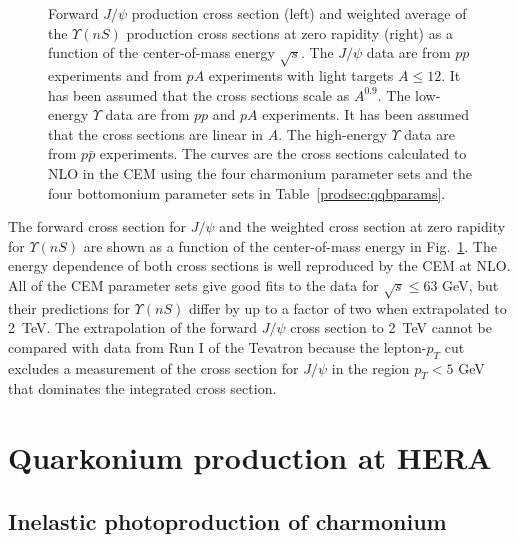\begin{figure}[htb]
\setlength{\epsfxsize=0.95\textwidth}
\setlength{\epsfysize=0.4\textheight}
\begin{center}
\end{center}
\caption{Forward $J/\psi$ production cross section (left) and weighted
average of the $\Upsilon(nS)$ production cross sections at zero rapidity
(right) as a function of the center-of-mass energy $\sqrt{s}$. The
$J/\psi$ data are from $pp$ experiments and from $pA$ experiments with
light targets $A \leq 12$. It has been assumed that the cross sections
scale as $A^{0.9}$.  The low-energy $\Upsilon$ data are from $pp$ and
$pA$ experiments. It has been assumed that the cross sections are linear
in $A$. The high-energy $\Upsilon$ data are from $p \bar p$ experiments.
The curves are the cross sections calculated to NLO in the CEM using the
four charmonium parameter sets and the four bottomonium parameter sets
in Table~\ref{prodsec:qqbparams}.}
\label{psiupsfixt}
\end{figure}

The forward cross section for $J/\psi$ and the weighted cross section at
zero rapidity for $\Upsilon(nS)$ are shown  as a function of the
center-of-mass energy in Fig.~\ref{psiupsfixt}. The energy dependence of
both cross sections is well reproduced by the CEM at NLO. All of the CEM
parameter sets give good fits to the data for $\sqrt{s} \leq 63$ GeV,
but their predictions for $\Upsilon(nS)$ differ by up to a factor of two
when extrapolated to 2~TeV. The extrapolation of the forward $J/\psi$
cross section to 2~TeV cannot be compared with data from Run I of the
Tevatron because the lepton-$p_T$ cut excludes a measurement of the
cross section for $J/\psi$ in the region $p_T < 5$ GeV that dominates 
the integrated cross section.




%
\section{Quarkonium production at HERA} 
\label{prodsec:hera}

\subsection{Inelastic photoproduction of charmonium}
\label{prodsec:hera:gp}

